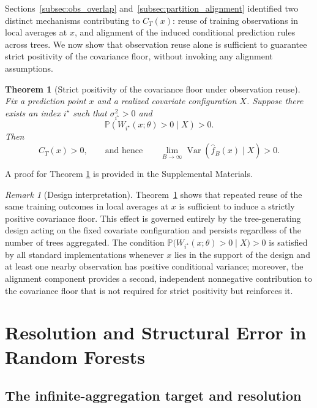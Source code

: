 \documentclass[11pt]{article}
\theoremstyle{plain}
\newtheorem{theorem}{Theorem}
\theoremstyle{definition}
\theoremstyle{remark}
\newtheorem{remark}{Remark}
\DeclareMathOperator{\Var}{Var}
\begin{document}
Sections~\ref{subsec:obs_overlap} and~\ref{subsec:partition_alignment} identified two distinct mechanisms contributing to \(C_T(x)\): reuse of training observations in local averages at \(x\), and alignment of the induced conditional prediction rules across trees. We now show that observation reuse alone is sufficient to guarantee strict positivity of the covariance floor, without invoking any alignment assumptions.

\begin{theorem}[Strict positivity of the covariance floor under observation reuse]
	\label{thm:cov_floor}
	Fix a prediction point \(x\) and a realized covariate configuration \(X\). Suppose there exists an index \(i^\star\) such that \(\sigma_{i^\star}^2>0\) and 
	\[
	\mathbb P\!\left(W_{i^\star}(x;\theta)>0 \mid X\right)>0.
	\]
	Then
	\[
	C_T(x)>0,
	\qquad\text{and hence}\qquad
	\lim_{B\to\infty}\Var\!\left(\hat f_B(x)\mid X\right)>0.
	\]
\end{theorem}

A proof for Theorem \ref{thm:cov_floor} is provided in the Supplemental Materials. 

\begin{remark}[Design interpretation]
	Theorem~\ref{thm:cov_floor} shows that repeated reuse of the same training outcomes in local averages at \(x\) is sufficient to induce a strictly positive covariance floor. This effect is governed entirely by the tree-generating design acting on the fixed covariate configuration and persists regardless of the number of trees aggregated. The condition 
	\(\mathbb{P}\!\bigl(W_{i^\star}(x;\theta) > 0 \mid X\bigr) > 0\) 
	is satisfied by all standard implementations whenever $x$ lies in the support of the design and at least one nearby observation has positive conditional variance; moreover, the alignment component provides a second, independent nonnegative contribution to the covariance floor that is not required for strict positivity but reinforces it.
\end{remark}

\section{Resolution and Structural Error in Random Forests}
\label{sec:resolution}

\subsection{The infinite-aggregation target and resolution}
\label{subsec:rf_resolution}
\end{document}
